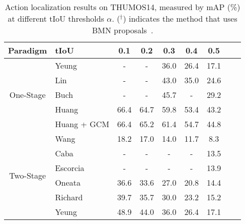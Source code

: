 \documentclass[10pt,journal,compsoc]{IEEEtran}
\begin{document}
	\begin{table}[!tb]
		\centering
		\caption{Action localization results on THUMOS14, measured by mAP (\%) at different tIoU thresholds $\alpha$. (${}^\dagger$) indicates the method that uses BMN proposals~\cite{lin2019bmn}.}
		\setlength{\tabcolsep}{4pt}
		\begin{tabular}{clccccccc}
			\hline
			Paradigm & tIoU                         & 0.1           & 0.2           & 0.3           & 0.4           & 0.5                     \\ \hline
			\multirow{5}{*}{One-Stage} & 
			Yeung \etal \cite{yeung2016end}     & -          & -          & 36.0          & 26.4          & 17.1          \\ 
			&Lin \etal \cite{lin2017single}     & -          & -          & 43.0          & 35.0          & 24.6          \\ 
			&Buch \etal \cite{buch2017end}            & -             & -             & 45.7          & -             & 29.2                    \\ \cline{2-7}
			&Huang \etal \cite{huang2019decoupling}                   & 66.4 &64.7 & 59.8& 53.4& 43.2 \\  
			&Huang \etal + GCM       & 66.4 & 65.2 & 61.4 & 54.7 & 44.8    \\ \hline \hline
			\multirow{28}{*}{Two-Stage}&Wang \etal \cite{wang2014action}         & 18.2          & 17.0          & 14.0          & 11.7          & 8.3                     \\
			&Caba \etal \cite{caba2016fast}           & -             & -            & -             & -             & 13.5  \\
			&Escorcia \etal  \cite{escorcia2016daps}  & -             & -             & -             & -             & 13.9                   \\
			&Oneata \etal \cite{oneata2014lear}       & 36.6          & 33.6          & 27.0          & 20.8          & 14.4                  \\
			&Richard \etal \cite{richard2016temporal} & 39.7          & 35.7          & 30.0          & 23.2          & 15.2                 \\
			&Yeung \etal \cite{yeung2016end}          & 48.9          & 44.0          & 36.0          & 26.4          & 17.1              \\

\end{tabular}
\end{table}
\end{document}
